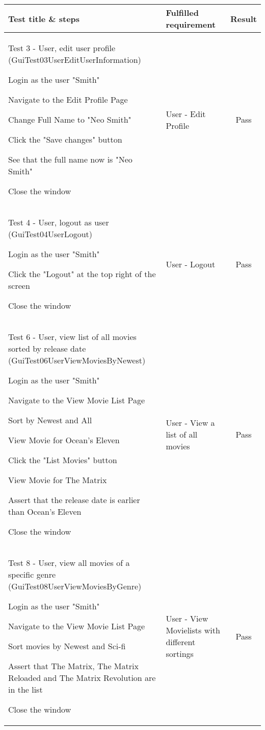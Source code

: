 \begin{centering}
\begin{longtable}{| p{5 cm} | p{7 cm} | c |}
\hline
Test title \& steps & Fulfilled requirement & Result\\

\hline
Test 3 - User, edit user profile (GuiTest03UserEditUserInformation)
\begin{my_enumerate}
\item Login as the user "Smith"
\item Navigate to the Edit Profile Page
\item Change Full Name to "Neo Smith"
\item Click the "Save changes" button
\item See that the full name now is "Neo Smith"
\item Close the window
\end{my_enumerate}& User - Edit Profile & Pass  \\

\hline
Test 4 - User, logout as user (GuiTest04UserLogout)
\begin{my_enumerate}
\item Login as the user "Smith"
\item Click the "Logout" at the top right of the screen
\item Close the window
\end{my_enumerate}& User - Logout & Pass  \\

\hline
Test 6 - User, view list of all movies sorted by release date (GuiTest06UserViewMoviesByNewest)
\begin{my_enumerate}
\item Login as the user "Smith"
\item Navigate to the View Movie List Page
\item Sort by Newest and All
\item View Movie for Ocean's Eleven
\item Click the "List Movies" button
\item View Movie for The Matrix
\item Assert that the release date is earlier than Ocean's Eleven
\item Close the window
\end{my_enumerate}& User - View a list of all movies & Pass  \\

\hline
Test 8 - User, view all movies of a specific genre (GuiTest08UserViewMoviesByGenre)
\begin{my_enumerate}
\item Login as the user "Smith"
\item Navigate to the View Movie List Page
\item Sort movies by Newest and Sci-fi
\item Assert that The Matrix, The Matrix Reloaded and The Matrix Revolution are in the list
\item Close the window
\end{my_enumerate}& User - View Movielists with different sortings & Pass  \\


\end{longtable}
\end{centering}
